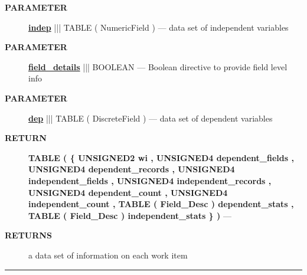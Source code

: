 \par
\begin{description}
\item [\colorbox{tagtype}{\color{white} \textbf{\textsf{PARAMETER}}}] \textbf{\underline{indep}} ||| TABLE ( NumericField ) --- data set of independent variables
\item [\colorbox{tagtype}{\color{white} \textbf{\textsf{PARAMETER}}}] \textbf{\underline{field\_details}} ||| BOOLEAN --- Boolean directive to provide field level info
\item [\colorbox{tagtype}{\color{white} \textbf{\textsf{PARAMETER}}}] \textbf{\underline{dep}} ||| TABLE ( DiscreteField ) --- data set of dependent variables
\end{description}







\par
\begin{description}
\item [\colorbox{tagtype}{\color{white} \textbf{\textsf{RETURN}}}] \textbf{TABLE ( \{ UNSIGNED2 wi , UNSIGNED4 dependent\_fields , UNSIGNED4 dependent\_records , UNSIGNED4 independent\_fields , UNSIGNED4 independent\_records , UNSIGNED4 dependent\_count , UNSIGNED4 independent\_count , TABLE ( Field\_Desc ) dependent\_stats , TABLE ( Field\_Desc ) independent\_stats \} )} --- 
\end{description}







\par
\begin{description}
\item [\colorbox{tagtype}{\color{white} \textbf{\textsf{RETURNS}}}] a data set of information on each work item
\end{description}



\rule{\linewidth}{0.5pt}

